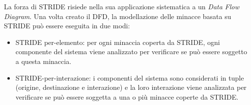 La forza di STRIDE risiede nella sua applicazione sistematica a un \textit{Data Flow Diagram}.
Una volta creato il DFD, la modellazione delle minacce basata su STRIDE può essere eseguita in due modi: 

\begin{itemize}
    \item STRIDE per-elemento: per ogni minaccia coperta da STRIDE, ogni componente del sistema viene analizzato per verificare se può essere soggetto a questa minaccia.
    \item STRIDE-per-interazione: i componenti del sistema sono considerati in tuple (origine, destinazione e interazione) e la loro interazione viene analizzata per verificare se può essere soggetta a una o più minacce coperte da STRIDE.
\end{itemize}










